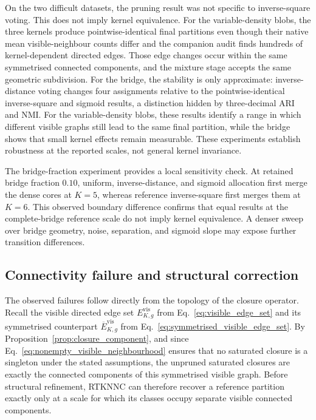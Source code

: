 \documentclass[review,12pt]{elsarticle}
\begin{document}
On the two difficult datasets, the pruning result was not specific to
inverse-square voting. This does not imply kernel equivalence. For the
variable-density blobs, the three kernels
produce pointwise-identical final partitions even though their native mean
visible-neighbour counts differ and the companion audit finds hundreds of
kernel-dependent directed edges.  Those edge changes occur within the same
symmetrised connected components, and the mixture stage accepts the same
geometric subdivision.  For the bridge, the stability is only approximate:
inverse-distance voting changes four assignments relative to the pointwise-identical inverse-square and sigmoid results, a distinction hidden by
three-decimal ARI and NMI. For the variable-density blobs, these results identify a range in which
different visible graphs still lead to the same final partition, while the
bridge shows that small kernel effects remain measurable. These experiments establish robustness at
the reported scales, not general kernel invariance.

The bridge-fraction experiment provides a local sensitivity check. At retained bridge
fraction $0.10$, uniform, inverse-distance, and sigmoid allocation first merge
the dense cores at $K=5$, whereas reference inverse-square first merges them
at $K=6$.  This observed boundary difference confirms that equal results at
the complete-bridge reference scale do not imply kernel equivalence.  A denser
sweep over bridge geometry, noise, separation, and sigmoid slope may expose
further transition differences.

\subsection{Connectivity failure and structural correction}

The observed failures follow directly from the topology of the closure
operator. Recall the visible directed edge set
$E^{\mathrm{vis}}_{K,g}$ from Eq.~\eqref{eq:visible_edge_set} and its
symmetrised counterpart
$\overline E^{\mathrm{vis}}_{K,g}$ from
Eq.~\eqref{eq:symmetrised_visible_edge_set}.
By Proposition~\ref{prop:closure_component}, and since
Eq.~\eqref{eq:nonempty_visible_neighbourhood} ensures that no saturated
closure is a singleton under the stated assumptions, the unpruned saturated
closures are exactly the connected components of this symmetrised visible graph.
Before structural refinement, RTKNNC
can therefore recover a reference partition exactly only at a scale for
which its classes occupy separate visible connected components.
\end{document}
